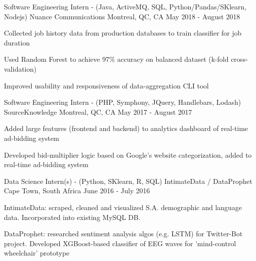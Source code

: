 


\begin{cventries}


\cventry
{Software Engineering Intern - (Java, ActiveMQ, SQL, Python/Pandas/SKlearn, Nodejs)} %
{Nuance Communications} %
{Montreal, QC, CA} %
{May 2018 - August 2018} %
{ %
\begin{cvitems}
\item {Collected job history data from production databases to train classifier for job duration}
\item {Used Random Forest to achieve 97\% accuracy on balanced dataset (k-fold cross-validation)}
\item {Improved usability and responsiveness of data-aggregation CLI tool}
\end{cvitems}
}


\cventry
{Software Engineering Intern - (PHP, Symphony, JQuery, Handlebars, Lodash)} %
{SourceKnowledge} %
{Montreal, QC, CA} %
{May 2017 - August 2017} %
{ %
\begin{cvitems}
\item {Added large features (frontend and backend) to analytics dashboard of real-time ad-bidding system}
\item {Developed bid-multiplier logic based on Google's website categorization, added to real-time ad-bidding system}
\end{cvitems}
}


\cventry
{Data Science Intern(s) - (Python, SKlearn, R, SQL)} %
{IntimateData / DataProphet} %
{Cape Town, South Africa} %
{June 2016 - July 2016} %
{ %
\begin{cvitems}
\item {IntimateData: scraped, cleaned and visualized S.A. demographic and language data. Incorporated into existing MySQL DB.}
\item {DataProphet: researched sentiment analysis algos (e.g. LSTM) for Twitter-Bot project. Developed XGBoost-based classifier of EEG waves for 'mind-control wheelchair' prototype}
\end{cvitems} 
}


\end{cventries}
